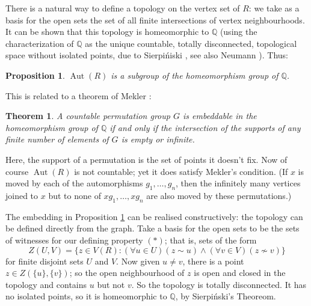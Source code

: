 \documentclass[12pt]{article}
\newtheorem{theorem}{Theorem}
\newtheorem{proposition}{Proposition}
\DeclareMathOperator{\Aut}{Aut}
\begin{document}
There is a natural way to define a topology on the vertex set of
$R$: we take as a basis for the open sets the set of all finite
intersections of vertex neighbourhoods. It can be shown that this
topology is homeomorphic to $\mathbb{Q}$ (using the characterization
of $\mathbb{Q}$ as the unique countable, totally disconnected,
topological space without isolated points, due to Sierpi\'{n}iski
\cite{ch32:bib48}, see also Neumann \cite{ch32:bib38}). Thus:

\begin{proposition}\label{ch32:prop9.1} 
$\Aut(R)$ is a subgroup of the homeomorphism group of $\mathbb{Q}$.
\end{proposition}

This is related to a theorem of Mekler \cite{ch32:bib36}:

\begin{theorem}\label{ch32:them9.1} 
A countable permutation group $G$ is embeddable
in the homeomorphism group of $\mathbb{Q}$ if and only if the
intersection of the supports of any finite number of elements of $G$
is empty or infinite.
\end{theorem}

Here, the support of a permutation is the set of points it doesn't
fix. Now of course $\Aut(R)$ is not countable; yet it does
satisfy Mekler's condition. (If $x$ is moved by each of the
automorphisms $g_1,\ldots,g_n$, then the infinitely many vertices
joined to $x$ but to none of $xg_1,\ldots, xg_n$ are also moved by
these permutations.)

The embedding in Proposition \ref{ch32:prop9.1} can be realised constructively:
the topology can be defined directly from the graph. Take a basis for the
open sets to be the sets of witnesses for our defining property $(*)$; that is, 
sets of the form
\[Z(U,V)=\{z\in V(R): (\forall u\in U)(z\sim u) \wedge (\forall v\in V)(z \not \sim v)\}\]
for finite disjoint sets $U$ and $V$. Now given $u\ne v$, there is a point
$z\in Z(\{u\},\{v\})$; so the open neighbourhood of $z$ is open and closed in
the topology and contains $u$ but not $v$. So the topology is totally
disconnected. It has no isolated points, so it is homeomorphic to $\mathbb{Q}$,
by Sierpi\'nski's Theoreom.
\end{document}
